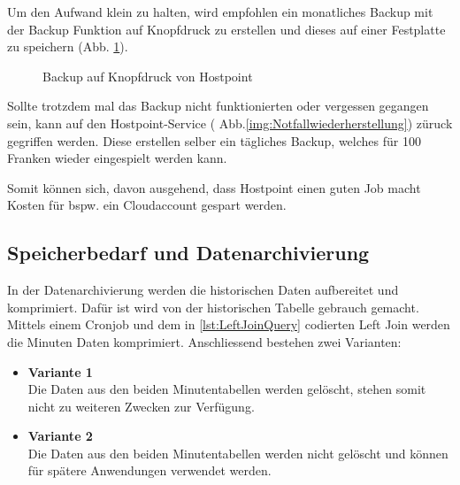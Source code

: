 Um den Aufwand klein zu halten, wird empfohlen ein monatliches Backup mit der Backup Funktion auf Knopfdruck zu erstellen und dieses auf einer Festplatte zu speichern (Abb. \ref{img:backup}).

\begin{figure}[htbp!]
	\centering
	\caption{Backup auf Knopfdruck von Hostpoint}
	\label{img:backup}
\end{figure}

Sollte trotzdem mal das Backup nicht funktionierten oder vergessen gegangen sein, kann auf den Hostpoint-Service ( Abb.\ref{img:Notfallwiederherstellung}) züruck gegriffen werden. Diese erstellen selber ein tägliches Backup, welches für 100 Franken wieder eingespielt werden kann.



Somit können sich, davon ausgehend, dass Hostpoint einen guten Job macht Kosten für bspw. ein Cloudaccount gespart werden.

\subsection{Speicherbedarf und Datenarchivierung}

In der Datenarchivierung werden die historischen Daten aufbereitet und komprimiert. Dafür ist wird von der historischen Tabelle gebrauch gemacht. Mittels einem Cronjob und dem in \ref{lst:LeftJoinQuery} codierten Left Join werden die Minuten Daten komprimiert. Anschliessend bestehen zwei Varianten:\\
\begin{itemize}
\item \textbf{Variante 1}\\
Die Daten aus den beiden Minutentabellen werden gelöscht, stehen somit nicht zu weiteren Zwecken zur Verfügung.
\item \textbf{Variante 2}\\
Die Daten aus den beiden Minutentabellen werden nicht gelöscht und können für spätere Anwendungen verwendet werden.
\end{itemize}

